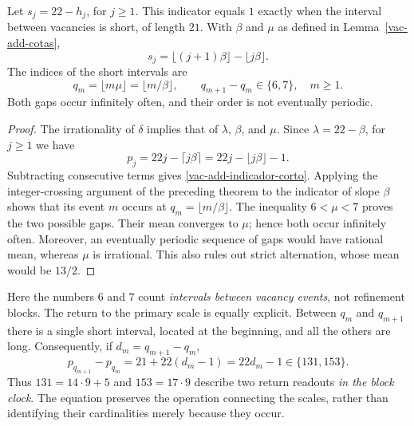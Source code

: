 \begin{theorem}
\label{vac-add-teorema-secundario}
Let \(s_j=22-h_j\), for \(j\geq1\). This indicator equals \(1\) exactly when the interval between vacancies is short, of length \(21\). With \(\beta\) and \(\mu\) as defined in Lemma~\ref{vac-add-cotas},
\begin{equation}
 s_j=\lfloor(j+1)\beta\rfloor-\lfloor j\beta\rfloor.
 \label{vac-add-indicador-corto}
\end{equation}
The indices of the short intervals are
\begin{equation}
 q_m=\lfloor m\mu\rfloor=\lfloor m/\beta\rfloor,
 \qquad q_{m+1}-q_m\in\{6,7\},\quad m\geq1.
 \label{vac-add-posiciones-cortos}
\end{equation}
Both gaps occur infinitely often, and their order is not eventually periodic.
\end{theorem}
\begin{proof}
The irrationality of \(\delta\) implies that of \(\lambda\), \(\beta\), and \(\mu\). Since \(\lambda=22-\beta\), for \(j\geq1\) we have
\[
 p_j=22j-\lceil j\beta\rceil
     =22j-\lfloor j\beta\rfloor-1.
\]
Subtracting consecutive terms gives \eqref{vac-add-indicador-corto}. Applying the integer-crossing argument of the preceding theorem to the indicator of slope \(\beta\) shows that its event \(m\) occurs at \(q_m=\lfloor m/\beta\rfloor\). The inequality \(6<\mu<7\) proves the two possible gaps. Their mean converges to \(\mu\); hence both occur infinitely often. Moreover, an eventually periodic sequence of gaps would have rational mean, whereas \(\mu\) is irrational. This also rules out strict alternation, whose mean would be \(13/2\).
\end{proof}

Here the numbers \(6\) and \(7\) count \emph{intervals between vacancy events}, not refinement blocks. The return to the primary scale is equally explicit. Between \(q_m\) and \(q_{m+1}\) there is a single short interval, located at the beginning, and all the others are long. Consequently, if \(d_m=q_{m+1}-q_m\),
\begin{equation}
 p_{q_{m+1}}-p_{q_m}=21+22(d_m-1)=22d_m-1
 \in\{131,153\}.
 \label{vac-add-retorno-bloques}
\end{equation}
Thus \(131=14\cdot9+5\) and \(153=17\cdot9\) describe two return readouts \emph{in the block clock}. The equation preserves the operation connecting the scales, rather than identifying their cardinalities merely because they occur.

